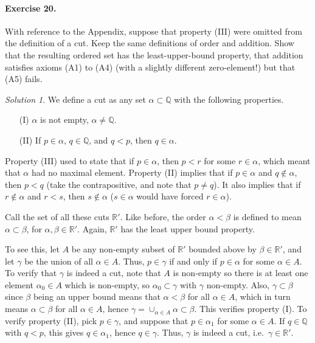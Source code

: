 \documentclass[11pt]{report}
\def\R{\mathbb{R}}
\def\Q{\mathbb{Q}}
\theoremstyle{remark}
\newtheorem*{solution}{Solution}
\begin{document}
    \paragraph{Exercise 20.} With reference to the Appendix, suppose that property
    (III) were omitted from the definition of a cut. Keep the same definitions of
    order and addition. Show that the resulting ordered set has the
    least-upper-bound property, that addition satisfies axioms (A1) to (A4) (with
    a slightly different zero-element!) but that (A5) fails.
    \begin{solution}
        We define a cut as any set $\alpha \subset \Q$ with the following properties.
        \begin{itemize}
            \itemsep0em
            \item[(I)] $\alpha$ is not empty, $\alpha \neq \Q$.
            \item[(II)] If $p \in \alpha$, $q \in \Q$, and $q < p$, then $q \in \alpha$.
        \end{itemize}
        Property (III) used to state that if $p \in \alpha$, then $p < r$ for some
        $r \in \alpha$, which meant that $\alpha$ had no maximal element.
        Property (II) implies that if $p \in \alpha$ and $q \notin \alpha$, then $p
        < q$ (take the contrapositive, and note that $p \neq q$). It also implies
        that if $r \notin \alpha$ and $r < s$, then $s \notin \alpha$ ($s \in
        \alpha$ would have forced $r \in \alpha$).

        Call the set of all these cuts $\R'$.
        Like before, the order $\alpha < \beta$ is defined to mean $\alpha \subset
        \beta$, for $\alpha, \beta \in \R'$. Again, $\R'$ has the least upper bound
        property.

        To see this, let $A$ be any non-empty subset of $\R'$ bounded above by
        $\beta \in \R'$, and let $\gamma$ be the union of all $\alpha \in A$. Thus,
        $p \in \gamma$ if and only if $p \in \alpha$ for some $\alpha \in A$. To
        verify that $\gamma$ is indeed a cut, note that $A$ is non-empty so there is
        at least one element $\alpha_0 \in A$ which is non-empty, so $\alpha_0
        \subset \gamma$ with $\gamma$ non-empty. Also, $\gamma \subset \beta$ since
        $\beta$ being an upper bound means that $\alpha < \beta$ for all $\alpha \in
        A$, which in turn means $\alpha \subset \beta$ for all $\alpha \in A$, hence
        $\gamma = \cup_{\alpha \in A} \alpha \subset \beta$. This verifies property
        (I). To verify property (II), pick $p \in \gamma$, and suppose that $p \in
        \alpha_1$ for some $\alpha \in A$. If $q \in \Q$ with $q < p$, this gives $q
        \in \alpha_1$, hence $q \in \gamma$. Thus, $\gamma$ is indeed a cut, i.e.\
        $\gamma \in \R'$.


\end{solution}
\end{document}
